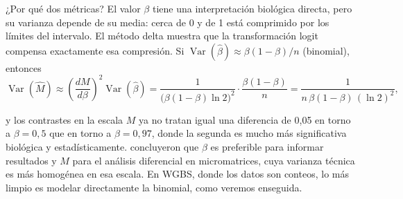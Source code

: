 ¿Por qué dos métricas? El valor $\beta$ tiene una interpretación biológica directa, pero su varianza depende de su media: cerca de 0 y de 1 está comprimido por los límites del intervalo. El método delta muestra que la transformación logit compensa exactamente esa compresión. Si $\operatorname{Var}(\hat\beta)\approx\beta(1-\beta)/n$ (binomial), entonces
\begin{equation}\label{eq:13-delta}
\operatorname{Var}(\hat M) \approx \left(\frac{dM}{d\beta}\right)^{2}\operatorname{Var}(\hat\beta)
= \frac{1}{\bigl(\beta(1-\beta)\ln2\bigr)^2}\cdot\frac{\beta(1-\beta)}{n}
= \frac{1}{n\,\beta(1-\beta)\,(\ln 2)^2},
\end{equation}
\begin{simbolos}
\end{simbolos}
\noindent y los contrastes en la escala $M$ ya no tratan igual una diferencia de 0,05 en torno a $\beta=0{,}5$ que en torno a $\beta=0{,}97$, donde la segunda es mucho más significativa biológica y estadísticamente. \textcite{c13-du2010} concluyeron que $\beta$ es preferible para informar resultados y $M$ para el análisis diferencial en micromatrices, cuya varianza técnica es más homogénea en esa escala. En WGBS, donde los datos son conteos, lo más limpio es modelar directamente la binomial, como veremos enseguida.

